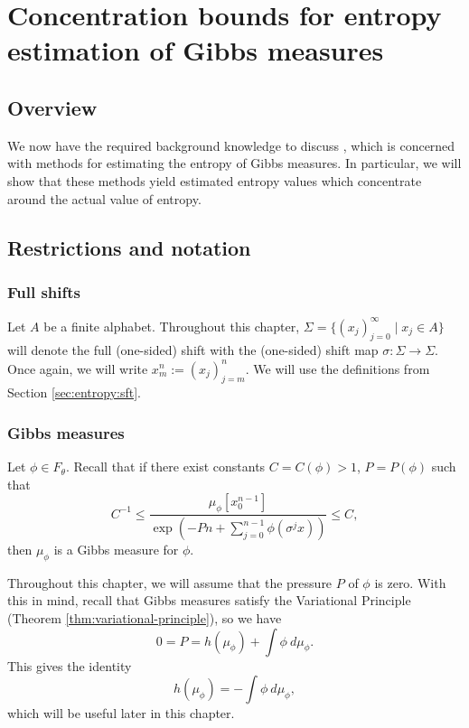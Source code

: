 \chapter[Concentration bounds for entropy estimation]{Concentration bounds for entropy estimation of Gibbs measures}\label{chap:concentration-bounds}
\section{Overview}
We now have the required background knowledge to discuss \cite{chazottes-maldonado:cbfee}, which is concerned with methods for estimating the entropy of Gibbs measures. In particular, we will show that these methods yield estimated entropy values which concentrate around the actual value of entropy.

\section{Restrictions and notation}
\subsection{Full shifts}
Let $A$ be a finite alphabet. Throughout this chapter, $\Sigma = \{(x_j)_{j = 0}^\infty \mid x_j \in A\}$ will denote the full (one-sided) shift with the (one-sided) shift map $\sigma : \Sigma \to \Sigma$. Once again, we will write $x_m^n := (x_j)_{j = m}^n$. We will use the definitions from Section \ref{sec:entropy:sft}.

\subsection{Gibbs measures}
Let $\phi \in F_\theta$. Recall that if there exist constants $C = C(\phi) > 1$, $P = P(\phi)$ such that
\[
	C^{-1} \leq \frac{\mu_\phi[x_0^{n - 1}]}{\exp\left(-Pn + \sum_{j = 0}^{n - 1}{\phi(\sigma^j x)}\right)} \leq C,
\]
then $\mu_\phi$ is a Gibbs measure for $\phi$.

Throughout this chapter, we will assume that the pressure $P$ of $\phi$ is zero. With this in mind, recall that
Gibbs measures satisfy the Variational Principle (Theorem \ref{thm:variational-principle}), so we have
\[
	0 = P = h(\mu_\phi) + \int{\phi\ d\mu_\phi}.
\]
This gives the identity
\begin{equation}\label{fml:vp-identity}
	h(\mu_\phi) = -\int{\phi\ d\mu_\phi},
\end{equation}
which will be useful later in this chapter.

